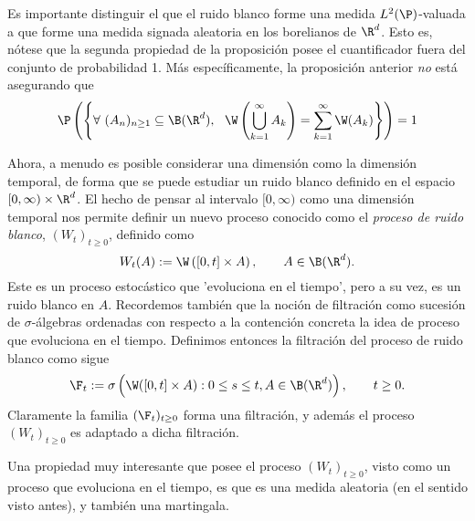  \begin{obs}
   Es importante distinguir el que el ruido blanco forme una medida $L^{2}(\P)$-valuada a que forme una medida signada aleatoria en los borelianos de $\R^d$. Esto es, nótese que la segunda propiedad de la proposición posee el cuantificador fuera del conjunto de probabilidad 1. Más específicamente, la proposición anterior \textit{no} está asegurando que 
   \[
   \P\left(\left\{\forall \ (A_n)_{n\geq1}\subseteq\B(\R^{d}), \ \ \W \left(\bigcup_{k=1}^\infty A_k\right)=\sum_{k=1}^{\infty}\W(A_k)\right\}\right)=1  
   \]
\end{obs}
Ahora, a menudo es posible considerar una dimensión como la dimensión temporal, de forma que se puede estudiar un ruido blanco definido en el espacio $[0,\infty)\times\R^{d}$. El hecho de pensar al intervalo $[0,\infty)$ como una dimensión temporal nos permite definir un nuevo proceso conocido como el \textit{proceso de ruido blanco}, $(W_t)_{t\geq0}$, definido como 
\[
W_t(A):=\W \left([0,t]\times A\right), \qquad A\in \B(\R^{d}).    
\]
Este es un proceso estocástico que 'evoluciona en el tiempo', pero a su vez, es un ruido blanco en $A$. Recordemos también que la noción de filtración como sucesión de $\sigma$-álgebras ordenadas con respecto a la contención concreta la idea de proceso que evoluciona en el tiempo. Definimos entonces la filtración del proceso de ruido blanco como sigue
\[
\F_t:=\sigma \left(\W([0,t]\times A):0\leq s\leq t, A\in \B(\R^{d})\right), \qquad t\geq0.    
\]
Claramente la familia $(\F_t)_{t\geq0}$ forma una filtración, y además el proceso $(W_t)_{t\geq0}$ es adaptado a dicha filtración.

Una propiedad muy interesante que posee el proceso $(W_t)_{t\geq0}$, visto como un proceso que evoluciona en el tiempo, es que es una medida aleatoria (en el sentido visto antes), y también una martingala. 

